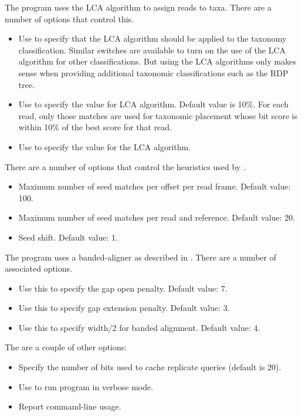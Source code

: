 \documentclass[11pt]{article}
\begin{document}
The program uses the LCA algorithm \cite{MEGAN2007} to assign reads to taxa. There are a number of options that control this.
\begin{itemize}
\setlength{\itemindent}{30pt}
\item[\itt{lca\_taxonomy}] Use to specify that the LCA algorithm should be applied to the taxonomy classification. Similar switches are available to turn on the use of the LCA algorithm for other classifications.
But using the LCA algorithms only makes sense when providing additional taxonomic classifications such as the RDP tree.
\item[\itt{--topPercent}]          Use to specify the  value for LCA algorithm. Default value is 10\%. For each read,
only those matches are used for taxonomic placement whose bit score is within 10\% of the best score for that read.
\item[\itt{--minSupport}]           Use to specify the  value for the LCA algorithm. 
\end{itemize}

There are a number of options that control the heuristics used by .
\begin{itemize}
\setlength{\itemindent}{30pt}
\item[{\itt{--maxSeedsPerFrame}}]   Maximum number of seed matches per offset per read frame. Default value: 100.
\item[{\itt{--maxSeedsPerRef}}]      Maximum number of seed matches per read and reference. Default value: 20.
\item[\itt{ --seedShift}]            Seed shift. Default value: 1.
\end{itemize}

The program uses a banded-aligner as described in \cite{ChaoPM92}. There are a number of associated options.
\begin{itemize}
\setlength{\itemindent}{30pt}
\item[\itt{--gapOpen}]             Use this to specify the gap open penalty. Default value: 7.
\item[\itt{--gapExtend}]            Use this to specify  gap extension penalty. Default value: 3.
\item[\itt{--band}]                 Use this to specify width/2 for banded alignment. Default value: 4.
\end{itemize}

The are a couple of other options:
\begin{itemize}
\setlength{\itemindent}{30pt}
\item[\itt{--replicateQueryCacheBits}] Specify the number of bits used to cache replicate queries (default is 20).
\item[\itt{--verbose}] Use to run program in verbose mode.
\item[\itt{--help}] Report command-line usage.
\end{itemize}
\end{document}
